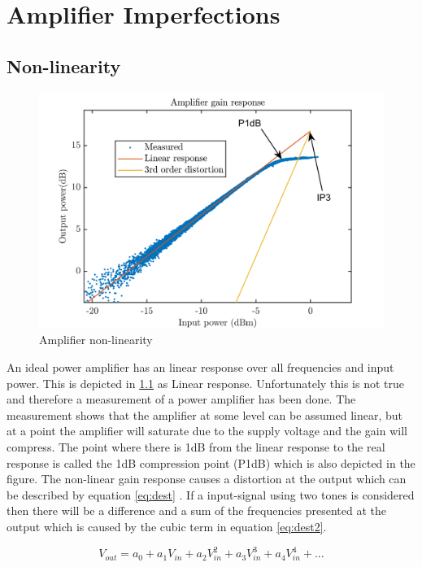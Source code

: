 \chapter{Amplifier Imperfections}\label{ch:1}

\section{Non-linearity}

\begin{figure}[H]
\centering 
\includegraphics[scale = 0.8]{figures/ch1/amp_lin.png}
\caption{Amplifier non-linearity}
\label{fig:amp_lin}
\end{figure} 

An ideal power amplifier has an linear response over all frequencies and input power. This is depicted in \ref{fig:amp_lin} as Linear response. Unfortunately this is not true and therefore a measurement of a power amplifier has been done. The measurement shows that the amplifier at some level can be assumed linear, but at a point the amplifier will saturate due to the supply voltage and the gain will compress. The point where there is 1dB from the linear response to the real response is called the 1dB compression point (P1dB) which is also depicted in the figure. The non-linear gain response causes a distortion at the output which can be described by equation \ref{eq:dest} \citep{NI}. If a input-signal using two tones is considered then there will be a difference and a sum of the frequencies presented at the output which is caused by the cubic term in equation \ref{eq:dest2}.

\begin{equation} \label{eq:dest}
V_{out} = a_0 + a_1 V_{in} + a_2 V_{in}^2 + a_3 V_{in}^3 + a_4 V_{in}^4 + ... 
\end{equation}

